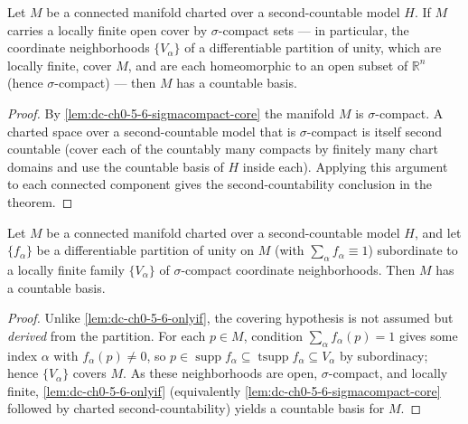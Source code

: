 \begin{lemma}
  \label{lem:dc-ch0-5-6-onlyif}


  Let $M$ be a connected manifold charted over a second-countable model $H$. If $M$
  carries a locally finite open cover by $\sigma$-compact sets — in particular, the
  coordinate neighborhoods $\{V_\alpha\}$ of a differentiable partition of unity,
  which are locally finite, cover $M$, and are each homeomorphic to an open subset
  of $\mathbb{R}^n$ (hence $\sigma$-compact) — then $M$ has a countable basis.
\end{lemma}
\begin{proof}
  \sketch

  By \cref{lem:dc-ch0-5-6-sigmacompact-core} the manifold $M$ is $\sigma$-compact.
  A charted space over a second-countable model that is $\sigma$-compact is itself
  second countable (cover each of the countably many compacts by finitely many chart
  domains and use the countable basis of $H$ inside each). Applying this argument to
  each connected component gives the second-countability
  conclusion in the theorem.
\end{proof}

\begin{lemma}
  \label{lem:dc-ch0-5-6-onlyif-pou}


  Let $M$ be a connected manifold charted over a second-countable model $H$, and let
  $\{f_\alpha\}$ be a differentiable partition of unity on $M$ (with $\sum_\alpha f_\alpha
  \equiv 1$) subordinate to a locally finite family $\{V_\alpha\}$ of $\sigma$-compact
  coordinate neighborhoods. Then $M$ has a countable basis.
\end{lemma}
\begin{proof}
  \sketch

  Unlike \cref{lem:dc-ch0-5-6-onlyif}, the covering hypothesis is not assumed but
  \emph{derived} from the partition. For each $p\in M$, condition $\sum_\alpha f_\alpha(p)=1$
  gives some index $\alpha$ with $f_\alpha(p)\neq0$, so $p\in\operatorname{supp}f_\alpha
  \subseteq\operatorname{tsupp}f_\alpha\subseteq V_\alpha$ by subordinacy; hence
  $\{V_\alpha\}$ covers $M$. As these neighborhoods are open, $\sigma$-compact, and locally
  finite, \cref{lem:dc-ch0-5-6-onlyif} (equivalently
  \cref{lem:dc-ch0-5-6-sigmacompact-core} followed by charted second-countability) yields a
  countable basis for $M$.
\end{proof}

